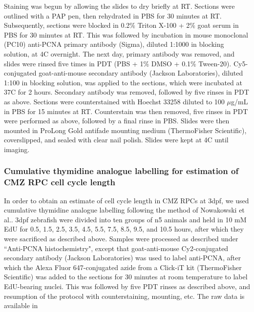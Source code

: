 Staining was begun by allowing the slides to dry briefly at RT. Sections were outlined with a PAP pen, then rehydrated in PBS for 30 minutes at RT. Subsequently, sections were blocked in 0.2\% Triton X-100 + 2\% goat serum in PBS for 30 minutes at RT. This was followed by incubation in mouse monoclonal (PC10) anti-PCNA primary antibody (Sigma), diluted 1:1000 in blocking solution, at 4\textdegree C overnight. The next day, primary antibody was removed, and slides were rinsed five times in PDT (PBS + 1\% DMSO + 0.1\% Tween-20). Cy5-conjugated goat-anti-mouse secondary antibody (Jackson Laboratories), diluted 1:100 in blocking solution, was applied to the sections, which were incubated at 37\textdegree C for 2 hours. Secondary antibody was removed, followed by five rinses in PDT as above. Sections were counterstained with Hoechst 33258 diluted to 100 $\mu$g/mL in PBS for 15 minutes at RT. Counterstain was then removed, five rinses in PDT were performed as above, followed by a final rinse in PBS. Slides were then mounted in ProLong Gold antifade mounting medium (ThermoFisher Scientific), coverslipped, and sealed with clear nail polish. Slides were kept at 4\textdegree C until imaging.

\subsubsection{Cumulative thymidine analogue labelling for estimation of CMZ RPC cell cycle length}
In order to obtain an estimate of cell cycle length in CMZ RPCs at 3dpf, we used cumulative thymidine analogue labelling following the method of Nowakowski et al.\cite{Nowakowski1989}. 3dpf zebrafish were divided into ten groups of n\=5 animals and held in 10 mM EdU for 0.5, 1.5, 2.5, 3.5, 4.5, 5.5, 7.5, 8.5, 9.5, and 10.5 hours, after which they were sacrificed as described above. Samples were processed as described under ``Anti-PCNA histochemistry", except that goat-anti-mouse Cy2-conjugated secondary antibody (Jackson Laboratories) was used to label anti-PCNA, after which the Alexa Fluor 647-conjugated azide from a Click-iT kit (ThermoFisher Scientific) was added to the sections for 30 minutes at room temperature to label EdU-bearing nuclei. This was followed by five PDT rinses as described above, and resumption of the protocol with counterstaining, mounting, etc. The raw data is available in 

